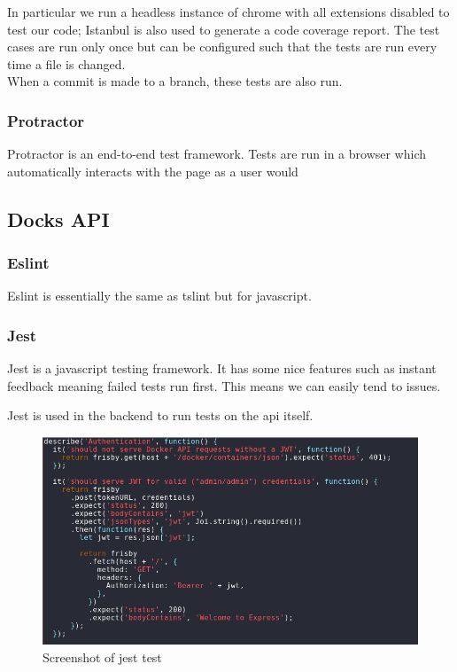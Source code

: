 \documentclass[]{article}
\begin{document}
In particular we run a headless instance of chrome with all extensions
disabled to test our code; Istanbul is also used to generate a code coverage
report. The test cases are run only once but can be configured such that the tests
are run every time a file is changed.
\\
When a commit is made to a branch, these tests are also run.

\subsubsection{Protractor}
Protractor is an end-to-end test framework. Tests are run in a browser which automatically interacts
with the page as a user would

\subsection{Docks API}

\subsubsection{Eslint}
Eslint is essentially the same as tslint but for javascript.

\subsubsection{Jest}
Jest is a javascript testing framework.
It has some nice features such as instant feedback meaning
failed tests run first. This means we can easily tend to issues.

Jest is used in the backend to run tests on the api itself.
\begin{figure}[H]
	\centering
	\includegraphics[scale=0.5]{jest.png}
	\caption{Screenshot of jest test}
\end{figure}
\end{document}
